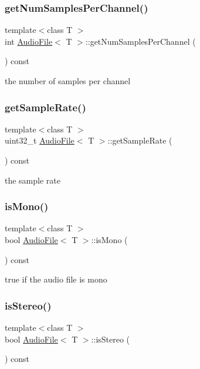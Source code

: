 \subsubsection{\texorpdfstring{get\+Num\+Samples\+Per\+Channel()}{getNumSamplesPerChannel()}}
{\footnotesize\ttfamily template$<$class T $>$ \\
int \hyperlink{class_audio_file}{Audio\+File}$<$ T $>$\+::get\+Num\+Samples\+Per\+Channel (\begin{DoxyParamCaption}{ }\end{DoxyParamCaption}) const}

the number of samples per channel \mbox{\label{class_audio_file_a8cd1b082af9db6bd180e4a63edcdefc9}} 
\subsubsection{\texorpdfstring{get\+Sample\+Rate()}{getSampleRate()}}
{\footnotesize\ttfamily template$<$class T $>$ \\
uint32\+\_\+t \hyperlink{class_audio_file}{Audio\+File}$<$ T $>$\+::get\+Sample\+Rate (\begin{DoxyParamCaption}{ }\end{DoxyParamCaption}) const}

the sample rate \mbox{\label{class_audio_file_a1057326fd2c2eca7cc7937f811868cf1}} 
\subsubsection{\texorpdfstring{is\+Mono()}{isMono()}}
{\footnotesize\ttfamily template$<$class T $>$ \\
bool \hyperlink{class_audio_file}{Audio\+File}$<$ T $>$\+::is\+Mono (\begin{DoxyParamCaption}{ }\end{DoxyParamCaption}) const}

true if the audio file is mono \mbox{\label{class_audio_file_a380a188d95f8f23b7622dfe222a7e8f6}} 
\subsubsection{\texorpdfstring{is\+Stereo()}{isStereo()}}
{\footnotesize\ttfamily template$<$class T $>$ \\
bool \hyperlink{class_audio_file}{Audio\+File}$<$ T $>$\+::is\+Stereo (\begin{DoxyParamCaption}{ }\end{DoxyParamCaption}) const}

